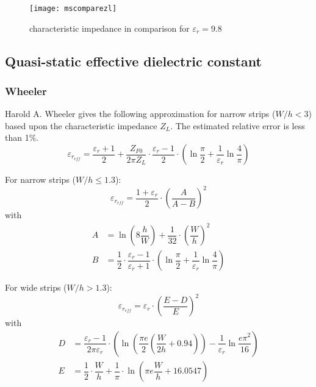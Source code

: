 \begin{figure}[ht]
\begin{center}
\texttt{[image: mscomparezl]}
\end{center}
\caption{characteristic impedance in comparison for $\varepsilon_{r} = 9.8$}
\label{fig:mscomparezl}
\end{figure}
\FloatBarrier

\subsection{Quasi-static effective dielectric constant}

\subsubsection{Wheeler}

Harold A. Wheeler \cite{Wheeler} gives the following approximation for
narrow strips ($W/h < 3$) based upon the characteristic impedance
$Z_L$.  The estimated relative error is less than 1\%.
\begin{equation}
\varepsilon_{r_{eff}} = \frac{\varepsilon_{r} + 1}{2} + \frac{Z_{F0}}{2\pi Z_{L}}\cdot \frac{\varepsilon_{r} - 1}{2}\cdot \left(\ln{\frac{\pi}{2}} + \frac{1}{\varepsilon_{r}} \ln{\frac{4}{\pi}}\right)
\end{equation}

For narrow strips ($W/h \le 1.3$):
\begin{equation}
\varepsilon_{r_{eff}} = \dfrac{1 + \varepsilon_r}{2}\cdot \left(\dfrac{A}{A - B}\right)^2
\end{equation}
with
\begin{align}
A &= \ln{\left(8\dfrac{h}{W}\right)} + \dfrac{1}{32}\cdot\left(\dfrac{W}{h}\right)^2\\
B &= \dfrac{1}{2}\cdot \dfrac{\varepsilon_r - 1}{\varepsilon_r + 1} \cdot\left(\ln{\dfrac{\pi}{2}} + \dfrac{1}{\varepsilon_r}\ln{\dfrac{4}{\pi}}\right)
\end{align}

For wide strips ($W/h > 1.3$):
\begin{equation}
\varepsilon_{r_{eff}} = \varepsilon_r\cdot\left(\dfrac{E - D}{E}\right)^2
\end{equation}
with
\begin{align}
D &= \dfrac{\varepsilon_r - 1}{2\pi \varepsilon_r}\cdot\left(\ln{\left(\dfrac{\pi e}{2}\left(\dfrac{W}{2h} + 0.94\right)\right)} - \dfrac{1}{\varepsilon_r} \ln{\dfrac{e\pi^{2}}{16}}\right)\\
E &= \dfrac{1}{2}\cdot\dfrac{W}{h} + \dfrac{1}{\pi}\cdot \ln{\left(\pi e \dfrac{W}{h} + 16.0547\right)}
\end{align}

